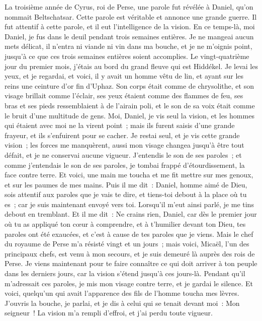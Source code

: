\begin{multicols}{2}
\VerseOne{}La troisième année de Cyrus, roi de Perse, une parole fut révélée à Daniel, qu'on nommait Beltschatsar. Cette parole est véritable et annonce une grande guerre. Il fut attentif à cette parole, et il eut l'intelligence de la vision.
En ce temps-là, moi Daniel, je fus dans le deuil pendant trois semaines entières.
Je ne mangeai aucun mets délicat, il n'entra ni viande ni vin dans ma bouche, et je ne m'oignis point, jusqu'à ce que ces trois semaines entières soient accomplies.
Le vingt-quatrième jour du premier mois, j'étais au bord du grand fleuve qui est Hiddékel.
Je levai les yeux, et je regardai, et voici, il y avait un homme vêtu de lin, et ayant sur les reins une ceinture d'or fin d'Uphaz.
Son corps était comme de chrysolithe, et son visage brillait comme l'éclair, ses yeux étaient comme des flammes de feu, ses bras et ses pieds ressemblaient à de l'airain poli, et le son de sa voix était comme le bruit d'une multitude de gens.
Moi, Daniel, je vis seul la vision, et les hommes qui étaient avec moi ne la virent point~; mais ils furent saisis d'une grande frayeur, et ils s'enfuirent pour se cacher.
Je restai seul, et je vis cette grande vision~; les forces me manquèrent, aussi mon visage changea jusqu'à être tout défait, et je ne conservai aucune vigueur.
J'entendis le son de ses paroles~; et comme j'entendais le son de ses paroles, je tombai frappé d'étourdissement, la face contre terre.
Et voici, une main me toucha et me fit mettre sur mes genoux, et sur les paumes de mes mains.
Puis il me dit~: Daniel, homme aimé de Dieu, sois attentif aux paroles que je vais te dire, et tiens-toi debout à la place où tu es~; car je suis maintenant envoyé vers toi. Lorsqu'il m'eut ainsi parlé, je me tins debout en tremblant.
Et il me dit~: Ne crains rien, Daniel, car dès le premier jour où tu as appliqué ton cœur à comprendre, et à t'humilier devant ton Dieu, tes paroles ont été exaucées, et c'est à cause de tes paroles que je viens.
Mais le chef du royaume de Perse m'a résisté vingt et un jours~; mais voici, Micaël, l'un des principaux chefs, est venu à mon secours, et je suis demeuré là auprès des rois de Perse.
Je viens maintenant pour te faire connaître ce qui doit arriver à ton peuple dans les derniers jours, car la vision s'étend jusqu'à ces jours-là.
Pendant qu'il m'adressait ces paroles, je mis mon visage contre terre, et je gardai le silence.
Et voici, quelqu'un qui avait l'apparence des fils de l'homme toucha mes lèvres. J'ouvris la bouche, je parlai, et je dis à celui qui se tenait devant moi~: Mon seigneur~! La vision m'a rempli d'effroi, et j'ai perdu toute vigueur.

\end{multicols}

